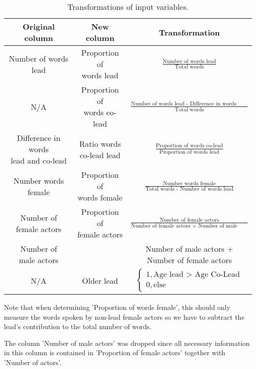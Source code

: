\documentclass{article}
\begin{document}
\begin{table}[h!]
	\centering
	\begin{tabular}{ccc}
		Original column & New column & Transformation \\
		\midrule
		Number of words lead & \makecell{Proportion of \\ words lead} & $\frac{\text{Number of words lead}}{\text{Total words}}$ \\
		N/A & \makecell{Proportion of \\ words co-lead} & $\frac{\text{Number of words lead - Difference in words lead and co-lead}}{\text{Total words}}$ \\
		\makecell{Difference in words \\ lead and co-lead} & \makecell{Ratio words \\ co-lead lead} & $\frac{\text{Proportion of words co-lead}}{\text{Proportion of words lead}}$ \\
		Number words female & \makecell{Proportion of \\ words female} & $\frac{\text{Number words female}}{\text{Total words - Number of words lead}}$ \\
		\makecell{Number of \\ female actors} & \makecell{Proportion of \\ female actors} & $\frac{\text{Number of female actors}}{\text{Number of female actors + Number of male actos}}$ \\
		\makecell{Number of \\ male actors} & \makecell{Number of actors} & \makecell{Number of male actors + \\ Number of female actors} \\
		N/A & Older lead & $\begin{cases} 1, \text{Age lead > Age Co-Lead} \\ 0, \text{else} \end{cases}$
	\end{tabular}
	\label{tab:transformations}
	\caption{Transformations of input variables.}
\end{table}

Note that when determining 'Proportion of words female', this should only measure the words spoken by non-lead female actors so we have to subtract the lead's contribution to the total number of words.

The column 'Number of male actors' was dropped since all necessary information in this column is contained in 'Proportion of female actors' together with 'Number of actors'.
\end{document}
